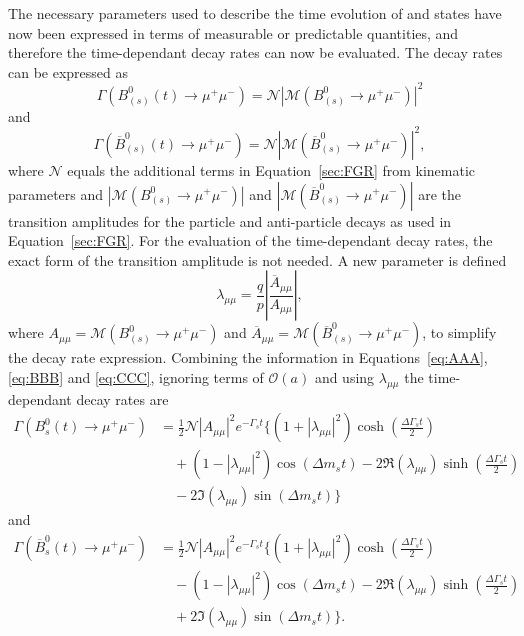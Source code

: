 The necessary parameters used to describe the time evolution of \bsd and \barbsd states have now been expressed in terms of measurable or predictable quantities, and therefore the time-dependant decay rates can now be evaluated. The decay rates can be expressed as
\begin{equation}
\Gamma (B^0_{(s)}(t) \to \mu^+ \mu^-) = \mathcal{N} \left|\mathcal{M}(B^0_{(s)} \to \mu^+ \mu^-)\right|^{2}
\end{equation}
and
\begin{equation}
 \Gamma (\overline{B}^0_{(s)}(t) \to \mu^+ \mu^-) =\mathcal{N}\left|\mathcal{M}(\overline{B}^0_{(s)} \to \mu^+ \mu^-)\right|^{2},
\label{eq:CCC}
\end{equation}
where $\mathcal{N}$ equals the additional terms in Equation~\ref{sec:FGR} from kinematic parameters and $\left|\mathcal{M}(B^0_{(s)} \to \mu^+ \mu^-)\right|$ and $\left|\mathcal{M}(\overline{B}^0_{(s)} \to \mu^+ \mu^-)\right|$ are the transition amplitudes for the particle and anti-particle decays as used in Equation~\ref{sec:FGR}. For the evaluation of the time-dependant decay rates, the exact form of the transition amplitude is not needed. A new parameter is defined
\begin{equation}
\lambda_{\mu\mu} = \frac{q}{p} \left| \frac{\overline{A}_{\mu\mu}}{A_{\mu\mu}}\right|,
\end{equation}
where $A_{\mu\mu} = \mathcal{M}(B^0_{(s)} \to \mu^+ \mu^-)$ and $\overline{A}_{\mu\mu} = \mathcal{M}(\overline{B}^0_{(s)} \to \mu^+ \mu^-)$, to simplify the decay rate expression. Combining the information in Equations~\ref{eq:AAA}, \ref{eq:BBB} and \ref{eq:CCC}, ignoring terms of $\mathcal{O}(a)$ and using $\lambda_{\mu\mu}$ the time-dependant decay rates are
\begin{align}
\Gamma(B^0_s(t) \to \mu^+ \mu^-) &=  \frac{1}{2} \mathcal{N} |A_{\mu\mu}|^2 e^{- \Gamma_s t} \bigg\{ (1 + |\lambda_{\mu\mu}|^2) \cosh \left( \frac{\Delta \Gamma_s t}{2} \right) \nonumber \\
& \quad {}+ ( 1 - |\lambda_{\mu\mu}|^2) \cos(\Delta m_s t) - 2\mathrm{\Re}(\lambda_{\mu\mu})\sinh \left(\frac{\Delta \Gamma_s t}{2}\right)\nonumber \\
& \quad {} - 2\mathrm{\Im}(\lambda_{\mu\mu})\sin(\Delta m_s t) \bigg\} \label{eq:decayratesApart} 
\end{align}
and
\begin{align}
\Gamma(\overline{B}^0_s(t) \to \mu^+ \mu^-) &=  \frac{1}{2} \mathcal{N}|A_{\mu\mu}|^2 e^{- \Gamma_s t} \bigg\{ (1 + |\lambda_{\mu\mu}|^2) \cosh \left( \frac{\Delta \Gamma_s t}{2} \right) \nonumber \\
& \quad {}- ( 1 - |\lambda_{\mu\mu}|^2) \cos(\Delta m_s t) -2\mathrm{\Re}(\lambda_{\mu\mu})\sinh \left(\frac{\Delta \Gamma_s t}{2}\right) \nonumber\\ 
& \quad {}+ 2\mathrm{\Im}(\lambda_{\mu\mu})\sin(\Delta m_s t) \bigg\}. \label{eq:decayratesA}
\end{align}
